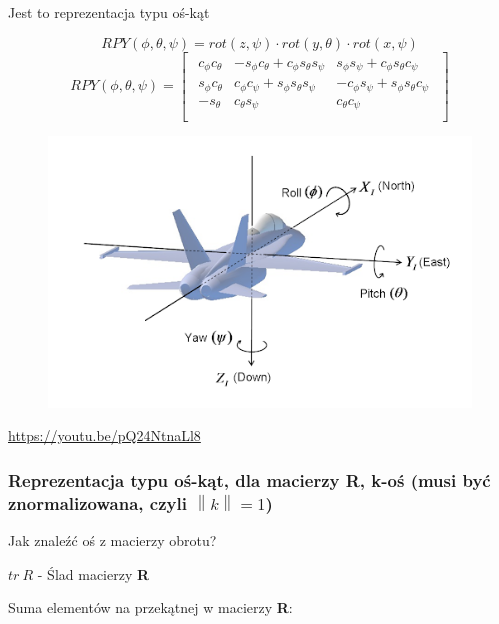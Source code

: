 \documentclass{article}
\newcommand{\norm}[1]{\left\lVert#1\right\rVert}
\begin{document}
Jest to reprezentacja typu oś-kąt

\Large
$$
    RPY\left(\phi, \theta, \psi\right)=rot(z, \psi) \cdot rot(y, \theta) \cdot rot(x, \psi)
$$
$$
    RPY( \phi, \theta, \psi ) = \begin{bmatrix} \begin{array}{rrr}
            c_{\phi} c_{\theta} & -s_{\phi} c_{\theta} + c_{\phi} s_{\theta} s_{\psi} & s_{\phi} s_{\psi} + c_{\phi} s_{\theta} c_{\psi}  \\
            s_{\phi} c_{\theta} & c_{\phi} c_{\psi} + s_{\phi} s_{\theta} s_{\psi}    & -c_{\phi} s_{\psi} + s_{\phi} s_{\theta} c_{\psi} \\
            -s_{\theta}         & c_{\theta} s_{\psi}                                 & c_{\theta} c_{\psi}                               \\
        \end{array} \end{bmatrix}
$$
\normalsize


\begin{figure}[h!]
    \centering
    \includegraphics[scale=0.5]{./img/rpy.png}
\end{figure}
\url{https://youtu.be/pQ24NtnaLl8}

\subsubsection{Reprezentacja typu oś-kąt, dla macierzy {\bf R}, k-oś (musi być znormalizowana, czyli $\norm{k}=1$)}

Jak znaleźć oś z macierzy obrotu?

$tr \ R$ - Ślad macierzy {\bf R}

Suma elementów na przekątnej w macierzy {\bf R}:
\end{document}
